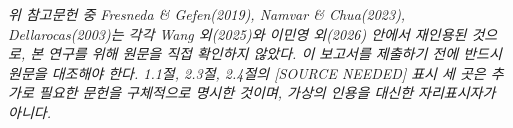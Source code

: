 \documentclass[10pt,a4paper]{article}
\begin{document}
\vspace{4pt}
{\footnotesize\textit{위 참고문헌 중 Fresneda \& Gefen(2019), Namvar \&
Chua(2023), Dellarocas(2003)는 각각 Wang 외(2025)와 이민영 외(2026) 안에서
재인용된 것으로, 본 연구를 위해 원문을 직접 확인하지 않았다. 이 보고서를
제출하기 전에 반드시 원문을 대조해야 한다. 1.1절, 2.3절, 2.4절의
[SOURCE NEEDED] 표시 세 곳은 추가로 필요한 문헌을 구체적으로 명시한
것이며, 가상의 인용을 대신한 자리표시자가 아니다.}}
\end{document}
